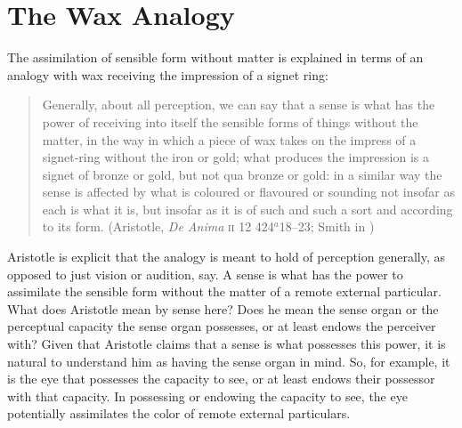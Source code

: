 
\section{The Wax Analogy} %
\label{sec:the_wax_analogy}

The assimilation of sensible form without matter is explained in terms of an analogy with wax receiving the impression of a signet ring:
\begin{quote}
	Generally, about all perception, we can say that a sense is what has the power of receiving into itself the sensible forms of things without the matter, in the way in which a piece of wax takes on the impress of a signet-ring without the iron or gold; what produces the impression is a signet of bronze or gold, but not qua bronze or gold: in a similar way the sense is affected by what is coloured or flavoured or sounding not insofar as each is what it is, but insofar as it is of such and such a sort and according to its form. (Aristotle, \emph{De Anima} \textsc{ii} 12 424\( ^{a} \)18--23; Smith in \citealt[42--43]{Barnes:1984uq})
\end{quote}
Aristotle is explicit that the analogy is meant to hold of perception generally, as opposed to just vision or audition, say. A sense is what has the power to assimilate the sensible form without the matter of a remote external particular. What does Aristotle mean by sense here? Does he mean the sense organ or the perceptual capacity the sense organ possesses, or at least endows the perceiver with? Given that Aristotle claims that a sense is what possesses this power, it is natural to understand him as having the sense organ in mind. So, for example, it is the eye that possesses the capacity to see, or at least endows their possessor with that capacity. In possessing or endowing the capacity to see, the eye potentially assimilates the color of remote external particulars.

